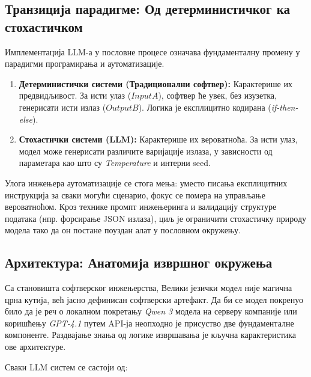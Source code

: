 \subsection{Транзиција парадигме: Од детерминистичког ка стохастичком}

Имплементација LLM-а у пословне процесе означава фундаменталну промену у парадигми програмирања и аутоматизације.

\begin{enumerate}
    \item \textbf{Детерминистички системи (Традиционални софтвер):}
    Карактерише их предвидљивост. За исти улаз ($Input A$), софтвер ће увек, без изузетка, генерисати исти излаз ($Output B$). Логика је експлицитно кодирана (\textit{if-then-else}).
    
    \item \textbf{Стохастички системи (LLM):}
    Карактерише их вероватноћа. За исти улаз, модел може генерисати различите варијације излаза, у зависности од параметара као што су \textit{Temperature} и интерни seed.
\end{enumerate}
\noindent
Улога инжењера аутоматизације се стога мења: уместо писања експлицитних инструкција за сваки могући сценарио, фокус се помера на управљање вероватноћом. Кроз технике промпт инжењеринга и валидацију структуре података (нпр. форсирање JSON излаза), циљ је ограничити стохастичку природу модела тако да он постане поуздан алат у пословном окружењу.


\subsection{Архитектура: Анатомија извршног окружења}

Са становишта софтверског инжењерства, Велики језички модел није магична црна кутија, већ јасно дефинисан софтверски артефакт. Да би се модел покренуо било да је реч о локалном покретању \textit{Qwen 3} модела на серверу компаније или коришћењу \textit{GPT-4.1} путем API-ја неопходно је присуство две фундаменталне компоненте. Раздвајање знања од логике извршавања је кључна карактеристика ове архитектуре.

Сваки LLM систем се састоји од:


